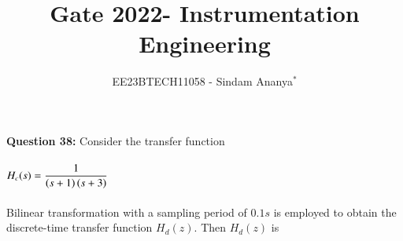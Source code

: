 \documentclass[journal,12pt,twocolumn]{IEEEtran}
\theoremstyle{remark}
\begin{document}

\vspace{3cm}

\title{Gate 2022- Instrumentation Engineering}
\author{EE23BTECH11058 - Sindam Ananya$^{*}$%
}
\maketitle
\newpage
\bigskip

\renewcommand{\thefigure}{\theenumi}
\renewcommand{\thetable}{\theenumi}

\vspace{3cm}
\textbf{Question 38:} 
Consider the transfer function\\\\
$ H_c(s) = \dfrac{1}{\left(s+1\right)\left(s+3\right)}$\\\\
Bilinear transformation with a sampling period of $0.1s$ is employed to obtain the discrete-time transfer function $H_d(z)$. Then $H_d(z)$ is 
\end{document}
